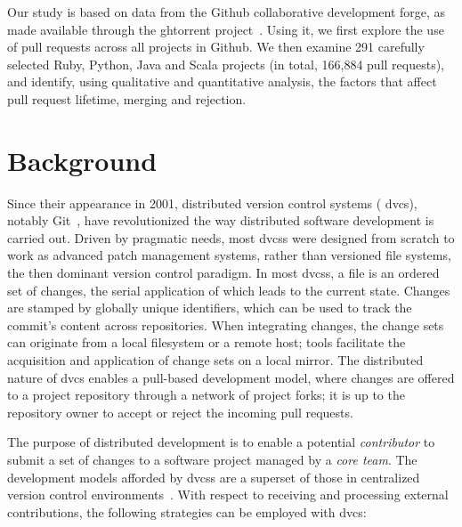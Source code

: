 \documentclass{sig-alternate}
\begin{document}
Our study is based on data from the Github collaborative development forge, as
made available through the {\sc ght}orrent project~\cite{G13}. Using it, we
first explore the use of pull requests across all projects in Github. We then
examine 291 carefully selected Ruby, Python, Java and Scala projects (in total,
166,884 pull requests), and identify, using  
qualitative and quantitative analysis, the
factors that affect pull request lifetime, merging and rejection. 

\section{Background} \label{sec:bg}

Since their appearance in 2001, distributed version control systems ({\sc
dvcs}), notably Git~\cite{Chaco09}, have revolutionized the way distributed
software development is carried out. Driven by pragmatic needs, most {\sc dvcs}s
were designed from scratch to work as advanced patch management systems, rather
than versioned file systems, the then dominant version control paradigm. In most
{\sc dvcs}s, a file is an ordered set of changes, the serial application of
which leads to the current state. Changes are stamped by globally unique
identifiers, which can be used to track the commit's content across
repositories. When integrating changes, the change sets can originate from a
local filesystem or a remote host; tools facilitate the acquisition and
application of change sets on a local mirror. The distributed nature of {\sc
dvcs} enables a pull-based development model, where changes are offered to a
project repository through a network of project forks; it is up to the
repository owner to accept or reject the incoming pull requests.

The purpose of distributed development is to enable a potential
\emph{contributor} to submit a set of changes to a software project managed by a
\emph{core team}. The development models afforded by {\sc dvcs}s are a superset
of those in centralized version control environments~\cite{Shiha12,Bird09}.
With respect to receiving and processing external contributions, the following
strategies can be employed with {\sc dvc}s:
\end{document}
